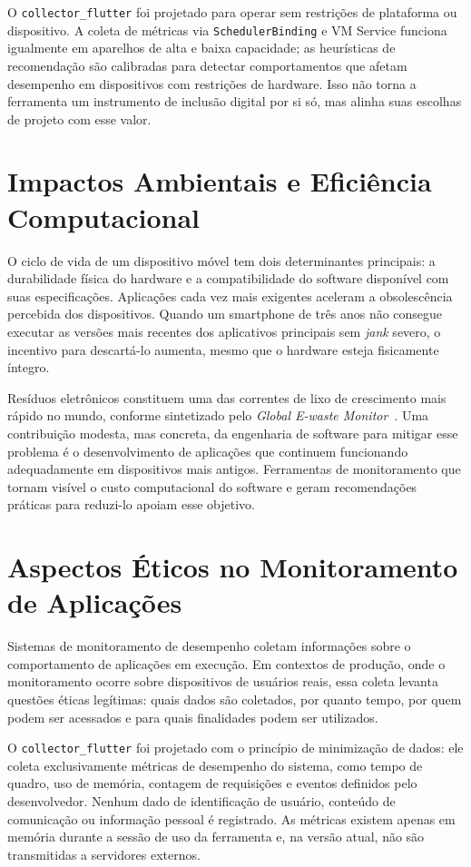 O \texttt{collector\_flutter} foi projetado para operar sem restrições de plataforma ou dispositivo. A coleta de métricas via \texttt{SchedulerBinding} e VM Service funciona igualmente em aparelhos de alta e baixa capacidade; as heurísticas de recomendação são calibradas para detectar comportamentos que afetam desempenho em dispositivos com restrições de hardware. Isso não torna a ferramenta um instrumento de inclusão digital por si só, mas alinha suas escolhas de projeto com esse valor.

\section{Impactos Ambientais e Eficiência Computacional}

O ciclo de vida de um dispositivo móvel tem dois determinantes principais: a durabilidade física do hardware e a compatibilidade do software disponível com suas especificações. Aplicações cada vez mais exigentes aceleram a obsolescência percebida dos dispositivos. Quando um smartphone de três anos não consegue executar as versões mais recentes dos aplicativos principais sem \textit{jank} severo, o incentivo para descartá-lo aumenta, mesmo que o hardware esteja fisicamente íntegro.

Resíduos eletrônicos constituem uma das correntes de lixo de crescimento mais rápido no mundo, conforme sintetizado pelo \textit{Global E-waste Monitor}~\cite{unitar2024ewaste}. Uma contribuição modesta, mas concreta, da engenharia de software para mitigar esse problema é o desenvolvimento de aplicações que continuem funcionando adequadamente em dispositivos mais antigos. Ferramentas de monitoramento que tornam visível o custo computacional do software e geram recomendações práticas para reduzi-lo apoiam esse objetivo.

\section{Aspectos Éticos no Monitoramento de Aplicações}

Sistemas de monitoramento de desempenho coletam informações sobre o comportamento de aplicações em execução. Em contextos de produção, onde o monitoramento ocorre sobre dispositivos de usuários reais, essa coleta levanta questões éticas legítimas: quais dados são coletados, por quanto tempo, por quem podem ser acessados e para quais finalidades podem ser utilizados.

O \texttt{collector\_flutter} foi projetado com o princípio de minimização de dados: ele coleta exclusivamente métricas de desempenho do sistema, como tempo de quadro, uso de memória, contagem de requisições e eventos definidos pelo desenvolvedor. Nenhum dado de identificação de usuário, conteúdo de comunicação ou informação pessoal é registrado. As métricas existem apenas em memória durante a sessão de uso da ferramenta e, na versão atual, não são transmitidas a servidores externos.

